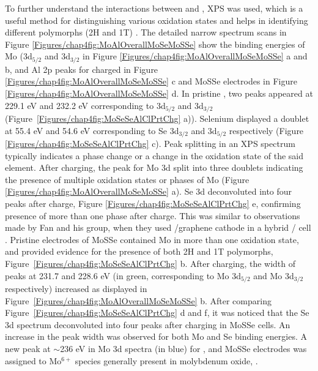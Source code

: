 To further understand the interactions between  and , XPS was used, which is a useful method for distinguishing various oxidation states and helps in identifying different polymorphs (2H and 1T) \cite{fan_hybrid_2017}. The detailed narrow spectrum scans in Figure \ref{Figures/chap4fig:MoAlOverallMoSeMoSSe} show the binding energies of Mo (3d$_{5/2}$ and 3d$_{3/2}$ in Figure \ref{Figures/chap4fig:MoAlOverallMoSeMoSSe} a and b, and Al 2p peaks for charged  in Figure \ref{Figures/chap4fig:MoAlOverallMoSeMoSSe} c and MoSSe electrodes in Figure \ref{Figures/chap4fig:MoAlOverallMoSeMoSSe} d. In pristine , two peaks appeared at 229.1 eV and 232.2 eV corresponding to 3d$_{5/2}$ and 3d$_{3/2}$ (Figure\ \ref{Figures/chap4fig:MoSeSeAlClPrtChg} a)). Selenium displayed a doublet at 55.4 eV and 54.6 eV corresponding to Se 3d$_{3/2}$ and 3d$_{5/2}$ respectively (Figure \ref{Figures/chap4fig:MoSeSeAlClPrtChg} c). Peak splitting in an XPS spectrum typically indicates a phase change or a change in the oxidation state of the said element. After charging, the peak for Mo 3d split into three doublets indicating the presence of multiple oxidation states or phases of Mo (Figure \ref{Figures/chap4fig:MoAlOverallMoSeMoSSe} a). Se 3d deconvoluted into four peaks after charge, Figure \ref{Figures/chap4fig:MoSeSeAlClPrtChg} e, confirming presence of more than one phase after charge. This was similar to observations made by Fan and his group, when they used /graphene cathode in a hybrid / cell \cite{fan_hybrid_2017}. Pristine electrodes of MoSSe contained Mo in more than one oxidation state, and provided evidence for the presence of both 2H and 1T polymorphs, Figure\ \ref{Figures/chap4fig:MoSeSeAlClPrtChg} b. After charging, the width of peaks at 231.7 and 228.6 eV (in green, corresponding to Mo 3d$_{5/2}$ and Mo 3d$_{3/2}$ respectively) increased as displayed in Figure\ \ref{Figures/chap4fig:MoAlOverallMoSeMoSSe} b. After comparing Figure\ \ref{Figures/chap4fig:MoSeSeAlClPrtChg} d and f, it was noticed that the Se 3d spectrum deconvoluted into four peaks after charging in MoSSe cells. An increase in the peak width was observed for both Mo and Se binding energies. A new peak at $\sim$236 eV in Mo 3d spectra (in blue) for ,  and MoSSe electrodes was assigned to Mo$^{6+}$ species generally present in molybdenum oxide, . 
